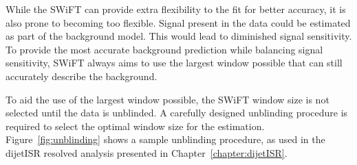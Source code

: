     While the SWiFT can provide extra flexibility to the fit for better accuracy, it is also prone to becoming too flexible. Signal present in the data could be estimated as part of the background model. This would lead to diminished signal sensitivity. To provide the most accurate background prediction while balancing signal sensitivity, SWiFT always aims to use the largest window possible that can still accurately describe the background.

To aid the use of the largest window possible, the SWiFT window size is not selected until the data is unblinded. A carefully designed unblinding procedure is required to select the optimal window size for the estimation. Figure~\ref{fig:unblinding} shows a sample unblinding procedure, as used in the dijetISR resolved analysis presented in Chapter~\ref{chapter:dijetISR}.


